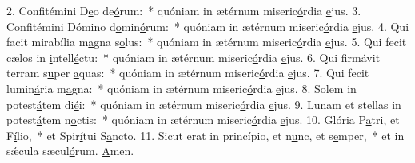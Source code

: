 2. Confitémini D\uline{e}o de\uline{ó}rum:~* quóniam in ætérnum miseric\uline{ó}rdia \uline{e}jus.
3. Confitémini Dómino d\uline{o}min\uline{ó}rum:~* quóniam in ætérnum miseric\uline{ó}rdia \uline{e}jus.
4. Qui facit mirabília m\uline{a}gna s\uline{o}lus:~* quóniam in ætérnum miseric\uline{ó}rdia \uline{e}jus.
5. Qui fecit cælos in \uline{i}ntell\uline{é}ctu:~* quóniam in ætérnum miseric\uline{ó}rdia \uline{e}jus.
6. Qui firmávit terram s\uline{u}per \uline{a}quas:~* quóniam in ætérnum miseric\uline{ó}rdia \uline{e}jus.
7. Qui fecit lumin\uline{á}ria m\uline{a}gna:~* quóniam in ætérnum miseric\uline{ó}rdia \uline{e}jus.
8. Solem in potest\uline{á}tem di\uline{é}i:~* quóniam in ætérnum miseric\uline{ó}rdia \uline{e}jus.
9. Lunam et stellas in potest\uline{á}tem n\uline{o}ctis:~* quóniam in ætérnum miseric\uline{ó}rdia \uline{e}jus.
10. Glória P\uline{a}tri, et F\uline{í}lio,~* et Spir\uline{í}tui S\uline{a}ncto.
11. Sicut erat in princípio, et n\uline{u}nc, et s\uline{e}mper,~* et in sǽcula sæcul\uline{ó}rum. \uline{A}men.
